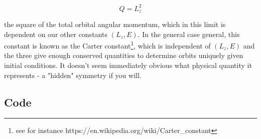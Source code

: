 \documentclass[10pt,a4paper]{report}
\begin{document}
\begin{equation*}
Q = L_z^2
\end{equation*}

the square of the total orbital angular momentum, which in this limit is dependent on our other constants $(L_z, E)$. In the general case general, this constant is known as the Carter constant\footnote{see for instance https://en.wikipedia.org/wiki/Carter_constant}, which is independent of $(L_z, E)$ and the three give enough conserved quantities to determine orbits uniquely given initial conditions. It doesn't seem immediately obvious what physical quantity it represents - a "hidden" symmetry if you will.


\newpage
\subsection*{Code}
\end{document}
